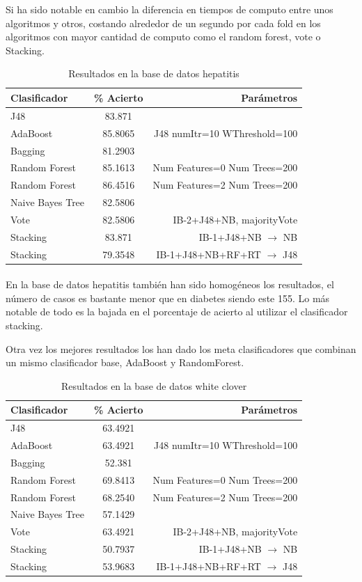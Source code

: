 \documentclass[es]{ifirak}
\begin{document}
 Si ha sido notable en cambio la diferencia en tiempos de computo entre unos algoritmos y otros, costando alrededor de un segundo por cada fold en los algoritmos con mayor cantidad de computo como el random forest, vote o Stacking. 

\begin{table}[htbp]
	\centering
	\begin{tabular}{l|c|r|}
		Clasificador & \% Acierto & Parámetros \\
		\hline
		J48 & 83.871 & \\
		AdaBoost &  85.8065  & J48 numItr=10 WThreshold=100 \\
		Bagging & 81.2903 &\\
		Random Forest  & 85.1613 & Num Features=0 Num Trees=200 \\
		Random Forest  & 86.4516 & Num Features=2 Num Trees=200 \\
		Naive Bayes Tree  & 82.5806 &\\
		Vote  & 82.5806 & IB-2+J48+NB, majorityVote \\
		Stacking  & 83.871 & IB-1+J48+NB $\rightarrow$ NB \\
		Stacking  & 79.3548 & IB-1+J48+NB+RF+RT $\rightarrow$ J48  \\
	\end{tabular}
	\caption{Resultados en la base de datos hepatitis}\label{table}
\end{table}

\paragraph{}
En la base de datos hepatitis también han sido homogéneos los resultados, el número de casos es bastante menor que en diabetes siendo este 155. Lo más notable de todo es la bajada en el porcentaje de acierto al utilizar el clasificador stacking.

Otra vez los mejores resultados los han dado los meta clasificadores que combinan un mismo clasificador base, AdaBoost y RandomForest.

\begin{table}[htbp]
	\centering
	\begin{tabular}{l|c|r|}
		Clasificador & \% Acierto & Parámetros \\
		\hline
		J48 & 63.4921 & \\
		AdaBoost &  63.4921  & J48 numItr=10 WThreshold=100 \\
		Bagging & 52.381 &\\
		Random Forest  & 69.8413 & Num Features=0 Num Trees=200 \\
		Random Forest  & 68.2540 & Num Features=2 Num Trees=200 \\
		Naive Bayes Tree  & 57.1429 &\\
		Vote  & 63.4921 & IB-2+J48+NB, majorityVote \\
		Stacking  & 50.7937 & IB-1+J48+NB $\rightarrow$ NB \\
		Stacking  & 53.9683 & IB-1+J48+NB+RF+RT $\rightarrow$ J48  \\
	\end{tabular}
	\caption{Resultados en la base de datos white clover}\label{table}
\end{table}
\end{document}
